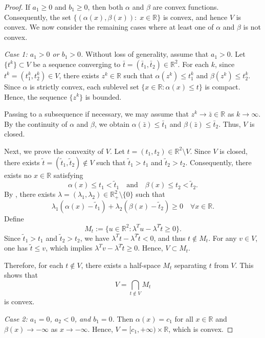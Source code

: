 \documentclass[]{interact}
\theoremstyle{plain}%
\theoremstyle{definition}
\theoremstyle{remark}
\begin{document}
	\begin{proof}
		If $a_1\geq 0$ and $b_1\geq 0$, then both $\alpha$ and $\beta$ are convex functions. Consequently, the set $\{(\alpha(x), \beta(x)):\; x\in \mathbb{R}\}$ is convex, and hence $V$ is convex. We now consider the remaining cases where at least one of $\alpha$ and $\beta$ is not convex.
		
		\medskip
		\noindent
		{\it Case 1: $a_1>0$ or $b_1>0$.}
		Without loss of generality, assume that $a_1>0$. Let $\{t^k\}\subset V$ be a sequence converging to $\bar t=(\bar t_1,\bar t_2)\in \mathbb{R}^2$. For each $k$, since $t^k=(t^k_1,t^k_2)\in V$, there exists $z^k\in \mathbb{R}$ such that
		$\alpha(z^k)\leq t^k_1$ and $\beta(z^k)\leq t^k_2$.
		Since $\alpha$ is strictly convex, each sublevel set $\{x\in \mathbb{R}:\alpha(x)\leq t\}$ is compact. Hence, the sequence $\{z^k\}$ is bounded.
		
		Passing to a subsequence if necessary, we may assume that $z^k\to \bar z\in \mathbb{R}$ as $k\to\infty$. By the continuity of $\alpha$ and $\beta$, we obtain
		$\alpha(\bar z)\leq \bar t_1$ and $\beta(\bar z)\leq \bar t_2$.
		Thus, $V$ is closed.
		
		Next, we prove the convexity of $V$. Let $t=(t_1,t_2)\in \mathbb{R}^2\setminus V$. Since $V$ is closed, there exists $\tilde t=(\tilde t_1,\tilde t_2)\notin V$ such that $\tilde t_1>t_1$ and $\tilde t_2>t_2$. Consequently, there exists no $x\in \mathbb{R}$ satisfying
		$$
		\alpha(x)\leq t_1<\tilde t_1
		\quad \text{and} \quad
		\beta(x)\leq t_2<\tilde t_2.
		$$
		By \cite[Corollary~8]{TuyTuan2013}, there exists $\lambda=(\lambda_1,\lambda_2)\in \mathbb{R}^2_+\setminus\{0\}$ such that
		$$
		\lambda_1(\alpha(x)-\tilde t_1)+\lambda_2(\beta(x)-\tilde t_2)\geq 0
		\quad \forall x\in \mathbb{R}.
		$$
		Define
		$$
		M_t:=\{u\in \mathbb{R}^2:\lambda^Tu-\lambda^T\tilde t\geq 0\}.
		$$
		Since $\tilde t_1>t_1$ and $\tilde t_2>t_2$, we have $\lambda^Tt-\lambda^T\tilde t<0$, and thus $t\notin M_t$. For any $v\in V$, one has $\tilde t\leq v$, which implies $\lambda^Tv-\lambda^T\tilde t\geq 0$. Hence, $V\subset M_t$.
		
		Therefore, for each $t\notin V$, there exists a half-space $M_t$ separating $t$ from $V$. This shows that
		$$
		V=\bigcap_{t\notin V} M_t
		$$
		is convex.
		
		\medskip
		\noindent
		{\it Case 2: $a_1=0$, $a_2<0$, and $b_1=0$.}
		Then $\alpha(x)=c_1$ for all $x\in \mathbb{R}$ and $\beta(x)\to -\infty$ as $x\to -\infty$. Hence,
		$V=[c_1,+\infty)\times\mathbb{R}$, which is convex.
		

\end{proof}
\end{document}
